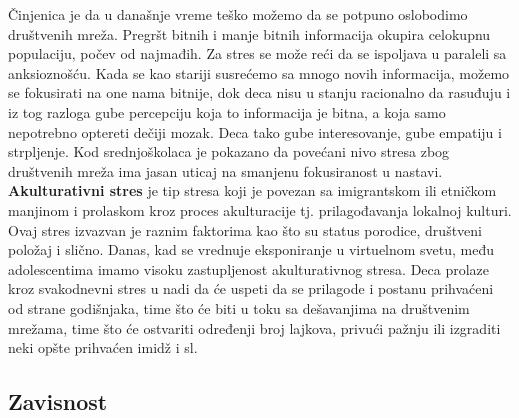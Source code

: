 \documentclass[a4paper]{article}
\begin{document}
{		Činjenica je da u današnje vreme teško možemo da se potpuno oslobodimo društvenih mreža. Pregršt bitnih i manje bitnih informacija okupira celokupnu populaciju, počev od najmađih. Za stres se može reći da se ispoljava u paraleli sa anksioznošću. Kada se kao stariji susrećemo sa mnogo novih informacija, možemo se fokusirati na one nama bitnije, dok deca nisu u stanju racionalno da rasuđuju i iz tog razloga gube percepciju koja to informacija je bitna, a koja samo nepotrebno optereti dečiji mozak. Deca tako gube interesovanje, gube empatiju i strpljenje. Kod srednjoškolaca je pokazano da povećani nivo stresa zbog društvenih mreža ima jasan uticaj na smanjenu fokusiranost u nastavi.\\
		\textbf{Akulturativni stres} je tip stresa koji je povezan sa imigrantskom ili etničkom manjinom i prolaskom kroz proces akulturacije tj. prilagođavanja lokalnoj kulturi. Ovaj stres izvazvan je raznim faktorima kao što su status porodice, društveni položaj i slično. Danas, kad se vrednuje eksponiranje u virtuelnom svetu, među adolescentima imamo visoku zastupljenost akulturativnog stresa. Deca prolaze kroz svakodnevni stres u nadi da će uspeti da se prilagode i postanu prihvaćeni od strane godišnjaka, time što će biti u toku sa dešavanjima na društvenim mrežama, time što će ostvariti određenji broj lajkova, privući pažnju ili izgraditi neki opšte prihvaćen imidž i sl.
		
		\subsection{Zavisnost}
		
}
\end{document}
